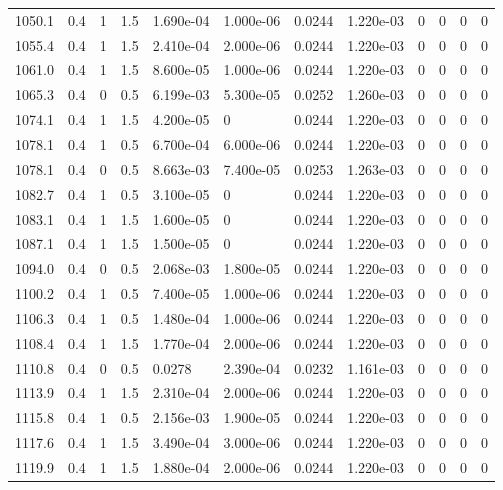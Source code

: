 \documentclass[preview]{standalone}
\begin{document}
{{{{{{{\begin{tabular}{L{1.2cm}C{1.2cm} C{0.3cm}C{0.5cm} C{1.4cm}C{1.4cm} C{1.4cm}C{1.4cm} C{1.6cm}C{1.6cm} C{1.6cm}C{1.6cm}}
  1050.1  &   0.4  & 1     & 1.5 &  1.690e-04  & 1.000e-06  &  0.0244&   1.220e-03& 0 & 0   &  0 & 0  \\ 
  1055.4  &   0.4  & 1     & 1.5 &  2.410e-04  & 2.000e-06  &  0.0244&   1.220e-03& 0 & 0   &  0 & 0  \\ 
  1061.0  &   0.4  & 1     & 1.5 &  8.600e-05  & 1.000e-06  &  0.0244&   1.220e-03& 0 & 0   &  0 & 0  \\ 
  1065.3  &   0.4  & 0     & 0.5 &  6.199e-03  & 5.300e-05  &  0.0252&   1.260e-03& 0 & 0   &  0 & 0  \\ 
  1074.1  &   0.4  & 1     & 1.5 &  4.200e-05  & 0  &  0.0244&   1.220e-03& 0 & 0   &  0 & 0  \\ 
  1078.1  &   0.4  & 1     & 0.5 &  6.700e-04  & 6.000e-06  &  0.0244&   1.220e-03& 0 & 0   &  0 & 0  \\ 
  1078.1  &   0.4  & 0     & 0.5 &  8.663e-03  & 7.400e-05  &  0.0253&   1.263e-03& 0 & 0   &  0 & 0  \\ 
  1082.7  &   0.4  & 1     & 0.5 &  3.100e-05  & 0  &  0.0244&   1.220e-03& 0 & 0   &  0 & 0  \\ 
  1083.1  &   0.4  & 1     & 1.5 &  1.600e-05  & 0  &  0.0244&   1.220e-03& 0 & 0   &  0 & 0  \\ 
  1087.1  &   0.4  & 1     & 1.5 &  1.500e-05  & 0  &  0.0244&   1.220e-03& 0 & 0   &  0 & 0  \\ 
  1094.0  &   0.4  & 0     & 0.5 &  2.068e-03  & 1.800e-05  &  0.0244&   1.220e-03& 0 & 0   &  0 & 0  \\ 
  1100.2  &   0.4  & 1     & 0.5 &  7.400e-05  & 1.000e-06  &  0.0244&   1.220e-03& 0 & 0   &  0 & 0  \\ 
  1106.3  &   0.4  & 1     & 0.5 &  1.480e-04  & 1.000e-06  &  0.0244&   1.220e-03& 0 & 0   &  0 & 0  \\ 
  1108.4  &   0.4  & 1     & 1.5 &  1.770e-04  & 2.000e-06  &  0.0244&   1.220e-03& 0 & 0   &  0 & 0  \\ 
  1110.8  &   0.4  & 0     & 0.5 &  0.0278  & 2.390e-04  &  0.0232&   1.161e-03& 0 & 0   &  0 & 0  \\ 
  1113.9  &   0.4  & 1     & 1.5 &  2.310e-04  & 2.000e-06  &  0.0244&   1.220e-03& 0 & 0   &  0 & 0  \\ 
  1115.8  &   0.4  & 1     & 0.5 &  2.156e-03  & 1.900e-05  &  0.0244&   1.220e-03& 0 & 0   &  0 & 0  \\ 
  1117.6  &   0.4  & 1     & 1.5 &  3.490e-04  & 3.000e-06  &  0.0244&   1.220e-03& 0 & 0   &  0 & 0  \\ 
  1119.9  &   0.4  & 1     & 1.5 &  1.880e-04  & 2.000e-06  &  0.0244&   1.220e-03& 0 & 0   &  0 & 0  \\ 

\end{tabular}}}}}}}}
\end{document}
